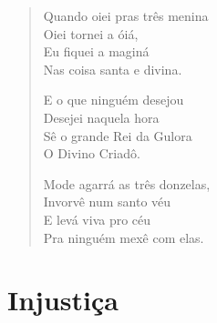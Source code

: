 \begin{verse}
Quando oiei pras três menina\\
Oiei tornei a óiá,\\
Eu fiquei a maginá\\
Nas coisa santa e divina.

E o que ninguém desejou\\
Desejei naquela hora\\
Sê o grande Rei da Gulora\\
O Divino Criadô.

Mode agarrá as três donzelas,\\
Invorvê num santo véu\\
E levá viva pro céu\\
Pra ninguém mexê com elas.
\end{verse}

\chapter{Injustiça}

